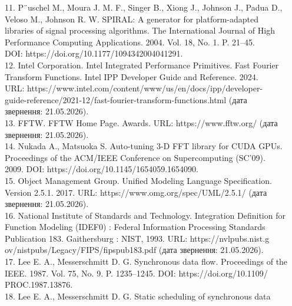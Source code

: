 \documentclass[
]{article}
\begin{document}
11. P¨uschel M., Moura J. M. F., Singer B., Xiong J., Johnson J., Padua
D.,\\
Veloso M., Johnson R. W. SPIRAL: A generator for platform-adapted\\
libraries of signal processing algorithms. The International Journal of
High\\
Performance Computing Applications. 2004. Vol. 18, No. 1. P. 21--45.\\
DOI: https://doi.org/10.1177/1094342004041291.\\
12. Intel Corporation. Intel Integrated Performance Primitives. Fast
Fourier\\
Transform Functions. Intel IPP Developer Guide and Reference. 2024.\\
URL: https://www.intel.com/content/www/us/en/docs/ipp/developer-\\
guide-reference/2021-12/fast-fourier-transform-functions.html (дата\\
звернення: 21.05.2026).\\
13. FFTW. FFTW Home Page. Awards. URL: https://www.fftw.org/ (дата\\
звернення: 21.05.2026).\\
14. Nukada A., Matsuoka S. Auto-tuning 3-D FFT library for CUDA GPUs.\\
Proceedings of the ACM/IEEE Conference on Supercomputing (SC'09).\\
2009. DOI: https://doi.org/10.1145/1654059.1654090.\\
15. Object Management Group. Unified Modeling Language Specification.\\
Version 2.5.1. 2017. URL: https://www.omg.org/spec/UML/2.5.1/ (дата\\
звернення: 21.05.2026).\\
16. National Institute of Standards and Technology. Integration
Definition for\\
Function Modeling (IDEF0) : Federal Information Processing Standards\\
Publication 183. Gaithersburg : NIST, 1993. URL:
https://nvlpubs.nist.g\\
ov/nistpubs/Legacy/FIPS/fipspub183.pdf (дата звернення: 21.05.2026).\\
17. Lee E. A., Messerschmitt D. G. Synchronous data flow. Proceedings of
the\\
IEEE. 1987. Vol. 75, No. 9. P. 1235--1245. DOI:
https://doi.org/10.1109/\\
PROC.1987.13876.\\
18. Lee E. A., Messerschmitt D. G. Static scheduling of synchronous data
\end{document}
